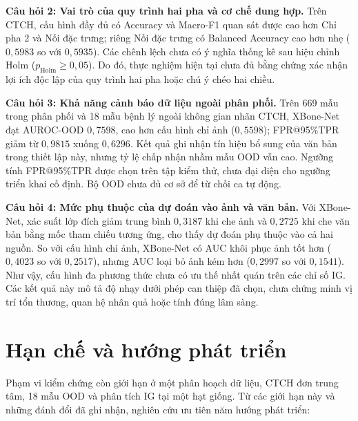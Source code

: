 \textbf{Câu hỏi 2: Vai trò của quy trình hai pha và cơ chế dung hợp.}
Trên CTCH, cấu hình đầy đủ có Accuracy và Macro-F1 quan sát được cao hơn Chỉ pha 2 và Nối đặc trưng; riêng Nối đặc trưng có Balanced Accuracy cao hơn nhẹ ($0{,}5983$ so với $0{,}5935$). Các chênh lệch chưa có ý nghĩa thống kê sau hiệu chỉnh Holm ($p_{\mathrm{Holm}} \ge 0{,}05$). Do đó, thực nghiệm hiện tại chưa đủ bằng chứng xác nhận lợi ích độc lập của quy trình hai pha hoặc chú ý chéo hai chiều.

\textbf{Câu hỏi 3: Khả năng cảnh báo dữ liệu ngoài phân phối.}
Trên 669 mẫu trong phân phối và 18 mẫu bệnh lý ngoài không gian nhãn CTCH, XBone-Net đạt AUROC-OOD $0{,}7598$, cao hơn cấu hình chỉ ảnh ($0{,}5598$); FPR@95\%TPR giảm từ $0{,}9815$ xuống $0{,}6296$. Kết quả ghi nhận tín hiệu bổ sung của văn bản trong thiết lập này, nhưng tỷ lệ chấp nhận nhầm mẫu OOD vẫn cao. Ngưỡng tính FPR@95\%TPR được chọn trên tập kiểm thử, chưa đại diện cho ngưỡng triển khai cố định. Bộ OOD chưa đủ cơ sở để từ chối ca tự động.

\textbf{Câu hỏi 4: Mức phụ thuộc của dự đoán vào ảnh và văn bản.}
Với XBone-Net, xác suất lớp đích giảm trung bình $0{,}3187$ khi che ảnh và $0{,}2725$ khi che văn bản bằng mốc tham chiếu tương ứng, cho thấy dự đoán phụ thuộc vào cả hai nguồn. So với cấu hình chỉ ảnh, XBone-Net có AUC khôi phục ảnh tốt hơn ($0{,}4023$ so với $0{,}2517$), nhưng AUC loại bỏ ảnh kém hơn ($0{,}2997$ so với $0{,}1541$). Như vậy, cấu hình đa phương thức chưa có ưu thế nhất quán trên các chỉ số IG. Các kết quả này mô tả độ nhạy dưới phép can thiệp đã chọn, chưa chứng minh vị trí tổn thương, quan hệ nhân quả hoặc tính đúng lâm sàng.

\section{Hạn chế và hướng phát triển}

Phạm vi kiểm chứng còn giới hạn ở một phân hoạch dữ liệu, CTCH đơn trung tâm, 18 mẫu OOD và phân tích IG tại một hạt giống. Từ các giới hạn này và những đánh đổi đã ghi nhận, nghiên cứu ưu tiên năm hướng phát triển:


